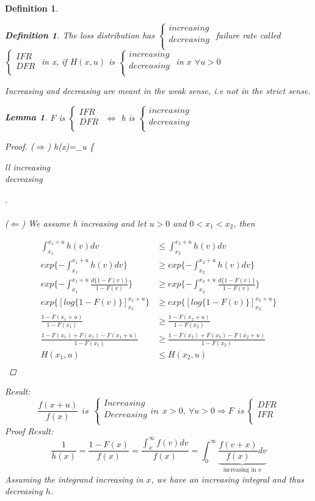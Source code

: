 \documentclass[11pt,a4paper,oneside]{article}\usepackage[]{graphicx}\usepackage[]{color}
\newtheorem{defi}[subsection]{Definition}
\newtheorem{lema}[thm]{Lemma}
\newcommand{\ttwopartdef}[2]
{
	\left\{
		\begin{array}{ll}
			#1 \\
			#2 \\
		\end{array}
	\right.
}
\begin{document}
\begin{algin*}
\begin{defi}
\begin{defi} The loss distribution has $\ttwopartdef{increasing}{decreasing}$ failure rate called $\ttwopartdef{IFR}{DFR}$ in x, if $H(x,u)$ is $\ttwopartdef{increasing}{decreasing}$ in $x$ $\forall u>0$
\end{defi}
Increasing and decreasing are meant in the weak sense, i.e not in the strict sense.

\begin{lema} $F$ is $\ttwopartdef{IFR}{DFR}$ $\Leftrightarrow$ h is $\ttwopartdef{increasing}{decreasing}$
\end{lema}
\begin{proof}
($\Rightarrow$) h(x)=\lim_{u}\ttwopartdef{increasing }{decreasing \text{ if F is DFR}}\\

\\
($\Leftarrow$) We assume h increasing and let $u>0$ and $0<x_1<x_2$, then

\begin{align*}
\int_{x_1}^{x_1+u}h(v)dv&\leq \int_{x_2}^{x_2+u}h(v)dv\\
exp\{-\int_{x_1}^{x_1+u}h(v)dv\}&\geq exp\{ -\int_{x_2}^{x_2+u}h(v)dv\}\\
exp\{-\int_{x_1}^{x_1+u}\frac{d\{1-F(v)\}}{1-F(v)}\}&\geq exp\{ -\int_{x_2}^{x_2+u}\frac{d\{1-F(v)\}}{1-F(v)}\}\\
exp\{[log\{1-F(v)\}]_{x_1}^{x_1+u}\}&\geq exp\{[log\{1-F(v)\}]_{x_2}^{x_2+u}\}\\
\frac{1-F(x_1+u)}{1-F(x_1)}&\geq \frac{1-F(x_2+u)}{1-F(x_2)}\\
\frac{1-F(x_1)+F(x_1)-F(x_1+u)}{1-F(x_1)}&\geq \frac{1-F(x_2)+F(x_2)-F(x_2+u)}{1-F(x_2)}\\
H(x_1,u)&\leq H(x_2,u)\\
\end{align*}
\end{proof}
Result: 
$$\frac{f(x+u)}{f(x)}\ \ is \ \ \ttwopartdef{Increasing}{Decreasing}in \ \ x>0,\ \forall u>0\Rightarrow F\ \ is \ \ttwopartdef{DFR}{IFR}$$
Proof Result:
$$\frac{1}{h(x)}=\frac{1-F(x)}{f(x)}=\frac{\int_x^{\infty}f(v)dv}{f(x)}=
\int_0^{\infty}\underbrace{\frac{f(v+x)}{f(x)}dv}_{\text{increasing in $x$}}
$$
Assuming the integrand increasing in $x$, we have an increasing integral and thus decreasing $h$.


\end{defi}
\end{algin*}
\end{document}
